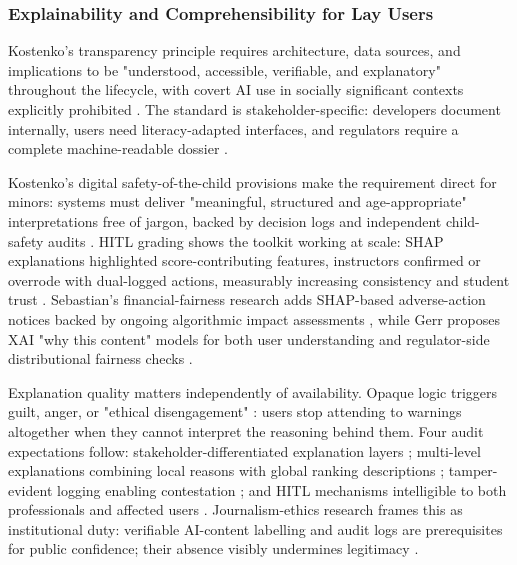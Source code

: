 \documentclass[11pt]{article}
\begin{document}
\subsubsection{Explainability and Comprehensibility for Lay Users}
\label{sec:explainability_lay_users} Kostenko's transparency principle requires architecture, data sources, and implications to be "understood, accessible, verifiable, and explanatory" throughout the lifecycle, with covert AI use in socially significant contexts explicitly prohibited \parencites[67]{2977039}. The standard is stakeholder-specific: developers document internally, users need literacy-adapted interfaces, and regulators require a complete machine-readable dossier \parencites[68]{2977039}.

Kostenko's digital safety-of-the-child provisions make the requirement direct for minors: systems must deliver "meaningful, structured and age-appropriate" interpretations free of jargon, backed by decision logs and independent child-safety audits \parencites[214]{2977039}[223]{2977039}. HITL grading shows the toolkit working at scale: SHAP explanations highlighted score-contributing features, instructors confirmed or overrode with dual-logged actions, measurably increasing consistency and student trust \parencites[16]{6805789}[21]{6805789}. Sebastian's financial-fairness research adds SHAP-based adverse-action notices backed by ongoing algorithmic impact assessments \parencites[6]{5442231}[15]{5442231}, while Gerr proposes XAI "why this content" models for both user understanding and regulator-side distributional fairness checks \parencites[8]{5142478}[30]{5142478}.

Explanation quality matters independently of availability. Opaque logic triggers guilt, anger, or "ethical disengagement" \parencites[8]{4245543}[191]{4245543}: users stop attending to warnings altogether when they cannot interpret the reasoning behind them. Four audit expectations follow: stakeholder-differentiated explanation layers \parencites[68]{2977039}[214]{2977039}; multi-level explanations combining local reasons with global ranking descriptions \parencites[68]{2977039}[8]{5142478}; tamper-evident logging enabling contestation \parencites[214]{2977039}[241]{2977039}; and HITL mechanisms intelligible to both professionals and affected users \parencites[16]{6805789}[21]{6805789}. Journalism-ethics research frames this as institutional duty: verifiable AI-content labelling and audit logs are prerequisites for public confidence; their absence visibly undermines legitimacy \parencites[94]{2977039}[4]{7076960}.
\end{document}
